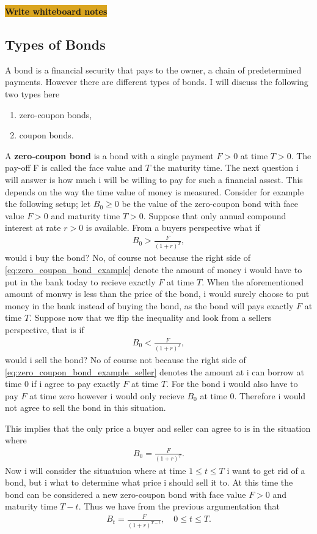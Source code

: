 \documentclass{article}
\theoremstyle{definition}
\numberwithin{equation}{section}
\newcommand{\commentcolor}{Goldenrod}
\newcommand{\comment}[1]{
    \begin{center}
        \colorbox{\commentcolor}{
            \textsf{
                \textbf{#1}
            }
        }
    \end{center}
}
\begin{document}
\comment{Write whiteboard notes}

\subsection{Types of Bonds}
A bond is a financial security that pays to the owner, a chain of predetermined payments.
However there are different types of bonds.
I will discuss the following two types here
\begin{enumerate}
    \item zero-coupon bonds,
    \item coupon bonds.
\end{enumerate}
A \textbf{zero-coupon bond} is a bond with a single payment $F > 0$ at time $T > 0$.
The pay-off F is called the face value and $T$ the maturity time.
The next question i will answer is how much i will be willing to pay for such a financial assest.
This depends on the way the time value of money is measured.
Consider for example the following setup; let $B_0 \geq 0$ be the value of the zero-coupon bond with face value $F>0$ and maturity time $T>0$.
Suppose that only annual compound interest at rate $r>0$ is available.
From a buyers perspective what if
\begin{align}\label{eq:zero_coupon_bond_example}
    B_0 > \frac{F}{(1 + r)^T},
\end{align}
would i buy the bond? 
No, of course not because the right side of \eqref{eq:zero_coupon_bond_example} denote the amount of money i would have to put in the bank today to recieve exactly $F$ at time $T$.
When the aforementioned amount of monwy is less than the price of the bond, i would surely choose to put money in the bank instead of buying the bond, as the bond will pays exactly $F$ at time $T$.
Suppose now that we flip the inequality and look from a sellers perspective, that is if
\begin{align}\label{eq:zero_coupon_bond_example_seller}
    B_0 < \frac{F}{(1 + r)^T},
\end{align}
would i sell the bond? 
No of course not because the right side of \eqref{eq:zero_coupon_bond_example_seller} denotes the amount at i can borrow at time 0 if i agree to pay exactly $F$ at time $T$.
For the bond i would also have to pay $F$ at time zero however i would only recieve $B_0$ at time 0.
Therefore i would not agree to sell the bond in this situation.

This implies that the only price a buyer and seller can agree to is in the situation where
\begin{align}
    B_0 = \frac{F}{(1 + r)^T}.
\end{align}
Now i will consider the situatuion where at time $1 \leq t \leq T$ i want to get rid of a bond, but i what to determine what price i should sell it to.
At this time the bond can be considered a new zero-coupon bond with face value $F > 0$ and maturity time $T - t$.
Thus we have from the previous argumentation that
\begin{align}
    B_t = \frac{F}{(1 + r)^{T - t}}, \quad 0 \leq t \leq T.
\end{align} 
\end{document}
